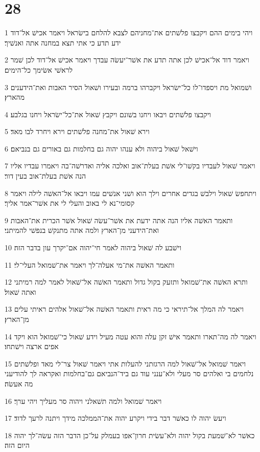 \chapter{28}

\par 1 ויהי בימים ההם ויקבצו פלשׁתים את־מחניהם לצבא להלחם בישׂראל ויאמר אכישׁ אל־דוד ידע תדע כי אתי תצא במחנה אתה ואנשׁיך׃
\par 2 ויאמר דוד אל־אכישׁ לכן אתה תדע את אשׁר־יעשׂה עבדך ויאמר אכישׁ אל־דוד לכן שׁמר לראשׁי אשׂימך כל־הימים׃
\par 3 ושׁמואל מת ויספדו־לו כל־ישׂראל ויקברהו ברמה ובעירו ושׁאול הסיר האבות ואת־הידענים מהארץ׃
\par 4 ויקבצו פלשׁתים ויבאו ויחנו בשׁונם ויקבץ שׁאול את־כל־ישׂראל ויחנו בגלבע׃
\par 5 וירא שׁאול את־מחנה פלשׁתים וירא ויחרד לבו מאד׃
\par 6 וישׁאל שׁאול ביהוה ולא ענהו יהוה גם בחלמות גם באורים גם בנביאם׃
\par 7 ויאמר שׁאול לעבדיו בקשׁו־לי אשׁת בעלת־אוב ואלכה אליה ואדרשׁה־בה ויאמרו עבדיו אליו הנה אשׁת בעלת־אוב בעין דור׃
\par 8 ויתחפשׂ שׁאול וילבשׁ בגדים אחרים וילך הוא ושׁני אנשׁים עמו ויבאו אל־האשׁה לילה ויאמר קסומי־נא לי באוב והעלי לי את אשׁר־אמר אליך׃
\par 9 ותאמר האשׁה אליו הנה אתה ידעת את אשׁר־עשׂה שׁאול אשׁר הכרית את־האבות ואת־הידעני מן־הארץ ולמה אתה מתנקשׁ בנפשׁי להמיתני׃
\par 10 וישׁבע לה שׁאול ביהוה לאמר חי־יהוה אם־יקרך עון בדבר הזה׃
\par 11 ותאמר האשׁה את־מי אעלה־לך ויאמר את־שׁמואל העלי־לי׃
\par 12 ותרא האשׁה את־שׁמואל ותזעק בקול גדול ותאמר האשׁה אל־שׁאול לאמר למה רמיתני ואתה שׁאול׃
\par 13 ויאמר לה המלך אל־תיראי כי מה ראית ותאמר האשׁה אל־שׁאול אלהים ראיתי עלים מן־הארץ׃
\par 14 ויאמר לה מה־תארו ותאמר אישׁ זקן עלה והוא עטה מעיל וידע שׁאול כי־שׁמואל הוא ויקד אפים ארצה וישׁתחו׃
\par 15 ויאמר שׁמואל אל־שׁאול למה הרגזתני להעלות אתי ויאמר שׁאול צר־לי מאד ופלשׁתים נלחמים בי ואלהים סר מעלי ולא־ענני עוד גם ביד־הנביאם גם־בחלמות ואקראה לך להודיעני מה אעשׂה׃
\par 16 ויאמר שׁמואל ולמה תשׁאלני ויהוה סר מעליך ויהי ערך׃
\par 17 ויעשׂ יהוה לו כאשׁר דבר בידי ויקרע יהוה את־הממלכה מידך ויתנה לרעך לדוד׃
\par 18 כאשׁר לא־שׁמעת בקול יהוה ולא־עשׂית חרון־אפו בעמלק על־כן הדבר הזה עשׂה־לך יהוה היום הזה׃
